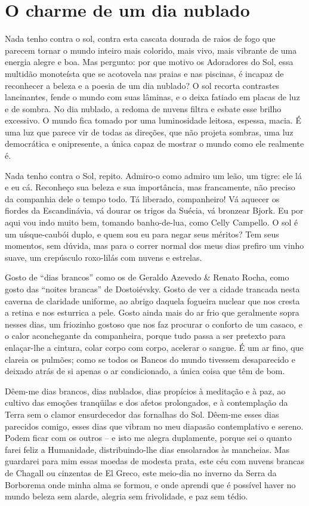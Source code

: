\chapter{O charme de um dia nublado}

Nada tenho contra o sol, contra esta cascata dourada de raios de fogo
que parecem tornar o mundo inteiro mais colorido, mais vivo, mais
vibrante de uma energia alegre e boa. Mas pergunto: por que motivo os
Adoradores do Sol, essa multidão monoteísta que se acotovela nas
praias e nas piscinas, é incapaz de reconhecer a beleza e a poesia de
um dia nublado? O sol recorta contrastes lancinantes, fende o mundo
com suas lâminas, e o deixa fatiado em placas de luz e de sombra. No
dia nublado, a redoma de nuvens filtra e esbate esse brilho
excessivo. O mundo fica tomado por uma luminosidade leitosa, espessa,
macia. É uma luz que parece vir de todas as direções, que não projeta
sombras, uma luz democrática e onipresente, a única capaz de mostrar
o mundo como ele realmente é.

Nada tenho contra o Sol, repito. Admiro-o como admiro um leão, um
tigre: ele lá e eu cá.  Reconheço sua beleza e sua importância, mas
francamente, não preciso da companhia dele o tempo todo. Tá liberado,
companheiro!  Vá aquecer os fiordes da Escandinávia, vá dourar os
trigos da Suécia, vá bronzear Bjork. Eu por aqui vou indo muito bem,
tomando banho-de-lua, como Celly Campello. O sol é um uísque-caubói
duplo, e quem sou eu para negar seus méritos?  Tem seus momentos, sem
dúvida, mas para o correr normal dos meus dias prefiro um vinho
suave, um crepúsculo roxo-lilás com nuvens e estrelas.

Gosto de “dias brancos” como os de Geraldo Azevedo \& Renato Rocha,
como gosto das “noites brancas” de Dostoiévsky. Gosto de ver a cidade
trancada nesta caverna de claridade uniforme, ao abrigo daquela
fogueira nuclear que nos cresta a retina e nos esturrica a pele.
Gosto ainda mais do ar frio que geralmente sopra nesses dias, um
friozinho gostoso que nos faz procurar o conforto de um casaco, e o
calor aconchegante da companheira, porque tudo passa a ser pretexto
para enlaçar-lhe a cintura, colar corpo com corpo, acelerar o sangue.
É um ar fino, que clareia os pulmões; como se todos os Bancos do
mundo tivessem desaparecido e deixado atrás de si apenas o ar
condicionado, a única coisa que têm de bom.

Dêem-me dias brancos, dias nublados, dias propícios à meditação e à
paz, ao cultivo das emoções tranqüilas e dos afetos prolongados, e à
contemplação da Terra sem o clamor ensurdecedor das fornalhas do Sol.
 Dêem-me esses dias parecidos comigo, esses dias que vibram no meu
diapasão contemplativo e sereno. Podem ficar com os outros -- e isto
me alegra duplamente, porque sei o quanto farei feliz a Humanidade,
distribuindo-lhe dias ensolarados às mancheias. Mas guardarei para
mim essas moedas de modesta prata, este céu com nuvens brancas de
Chagall ou cinzentas de El Greco, este meio-dia no inverno da Serra
da Borborema onde minha alma se formou, e onde aprendi que é possível
haver no mundo beleza sem alarde, alegria sem frivolidade, e paz sem
tédio.

